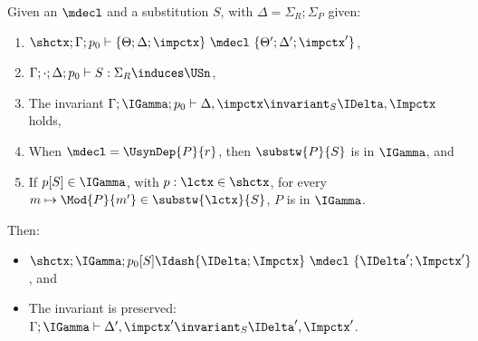 \begin{theorem}
\label{thm:mdecl}
Given an $\mdecl$ and a substitution $S$, with $\Delta = \Sigma_R; \Sigma_P$ given:
\begin{enumerate}
\item $\shctx; \Gamma; p_0 \vdash \{ \Theta; \Delta; \impctx \} ~ \mdecl ~ \{ \Theta'; \Delta'; \impctx' \}$,
\item $\Gamma; \cdot; \Delta; p_0 \vdash S : \Sigma_R \induces \USn$,
\item The invariant $\Gamma; \IGamma; p_0 \vdash \Delta, \impctx \invariant_S \IDelta, \Impctx$ holds,
\item When $\mdecl = \UsynDep{P}{r}$, then $\substw{P}{S}$ is in $\IGamma$, and
\item If $p[S] \in \IGamma$, with $p : \lctx \in \shctx$, for every $m \mapsto \Mod{P}{m'} \in \substw{\lctx}{S}$, $P$ is in $\IGamma$.
\end{enumerate}
Then:
\begin{itemize}
\item $\shctx; \IGamma; p_0[S] \Idash \{ \IDelta; \Impctx \} ~ \mdecl ~ \{ \IDelta'; \Impctx' \}$, and
\item The invariant is preserved: $\Gamma; \IGamma \vdash \Delta', \impctx' \invariant_S \IDelta', \Impctx'$.
\end{itemize}
\end{theorem}
